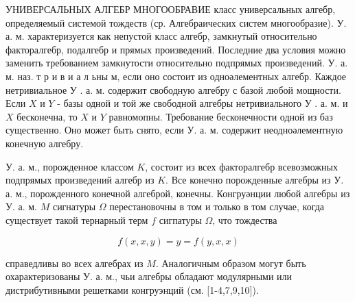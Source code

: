 \documentclass[10pt]{article}
\begin{document}
УНИВЕРСАЛЬНЫХ АЛГЕБР МНОГООБРАВИЕ класс универсальных алгебр, определяемый системой тождеств (ср. Алгебраических систем многообразие). У. а. м. характеризуется как непустой класс алгебр, замкнутый относительно факторалгебр, подалгебр и прямых произведений. Последние два условия можно заменить требованием замкнутости относительно подпрямых произведений. У. а. м. наз. т р и в и а л ьны м, если оно состоит из одноәлементных алгебр. Каждое нетривиальное У . а. м. содержит свободную алгебру с базой любой мощности. Если $X$ и $Y$ - базы одной и той же свободной алгебры нетривиального У . а. м. и $X$ бесконечна, то $X$ и $Y$ равномопны. Требование бесконечности одной из баз существенно. Оно может быть снято, если У. а. м. содержит неодноәлементную конечную алгебру.



У. а. м., порожденное классом $K$, состоит из всех факторалгебр всевозможных подпрямых произведений алгебр из $K$. Все конечно порожденные алгебры из У. а. м., порожденного конечной алгеброй, конечны. Конгруәнции любой алгебры из У. а. м. $M$ сигнатуры $\Omega$ перестановочны в том и только в том случае, когда существует такой тернарный терм $f$ сигпатуры $\Omega$, что тождества



\[

f(x, x, y)=y=f(y, x, x)

\]



справедливы во всех алгебрах из $M$. Аналогичным образом могут быть охарактеризованы У. а. м., чьи алгебры обладают модулярными или дистрибутивными решетками конгруэнций (см. [1-4,7,9,10]).
\end{document}
